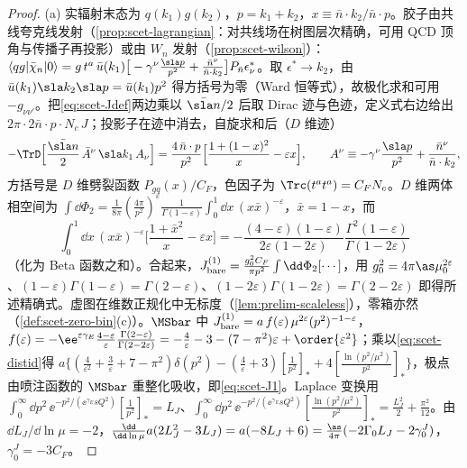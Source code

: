 \begin{proof}
(a) 实辐射末态为 $q(k_1)g(k_2)$，$p=k_1+k_2$，$x\equiv\bar n\cdot k_2/\bar n\cdot p$。胶子由共线夸克线发射（\cref{prop:scet-lagrangian}：对共线场在树图层次精确，可用 QCD 顶角与传播子再投影）或由 $W_n$ 发射（\cref{prop:scet-wilson}）：
$\langle qg|\bar\chi_n|0\rangle=g\,t^a\,\bar u(k_1)\big[-\gamma^\nu\frac{\sla p}{p^2}+\frac{\bar n^\nu}{\bar n\cdot k_2}\big]P_{\bar n}\epsilon^*_\nu$。取 $\epsilon^*\to k_2$，由 $\bar u(k_1)\sla k_2\sla p=\bar u(k_1)p^2$ 得方括号为零（Ward 恒等式），故极化求和可用 $-g_{\nu\nu'}$。把\cref{eq:scet-Jdef}两边乘以 $\bar{\sla n}/2$ 后取 Dirac 迹与色迹，定义式右边给出 $2\pi\cdot2\bar n\cdot p\cdot N_c\,J$；投影子在迹中消去，自旋求和后（$D$ 维迹）
\[
-\TrD\Big[\frac{\bar{\sla n}}{2}\,\bar A^\nu\,\sla k_1\,A_\nu\Big]=\frac{4\,\bar n\cdot p}{p^2}\Big[\frac{1+(1-x)^2}{x}-\varepsilon x\Big],\qquad A^\nu\equiv-\gamma^\nu\frac{\sla p}{p^2}+\frac{\bar n^\nu}{\bar n\cdot k_2},
\]
方括号是 $D$ 维劈裂函数 $P_{gq}(x)/C_F$，色因子为 $\Trc(t^at^a)=C_FN_c$。$D$ 维两体相空间为 $\int\dd\Phi_2=\frac{1}{8\pi}(\frac{4\pi}{p^2})^\varepsilon\frac{1}{\Gamma(1-\varepsilon)}\int_0^1\dd x\,(x\bar x)^{-\varepsilon}$，$\bar x=1-x$，而
\[
\int_0^1\dd x\,(x\bar x)^{-\varepsilon}\Big[\frac{1+\bar x^2}{x}-\varepsilon x\Big]=-\frac{(4-\varepsilon)(1-\varepsilon)}{2\varepsilon(1-2\varepsilon)}\frac{\Gamma^2(1-\varepsilon)}{\Gamma(1-2\varepsilon)}
\]
（化为 Beta 函数之和）。合起来，$J^{(1)}_{\rm bare}=\frac{g_0^2C_F}{\pi p^2}\int\dd\Phi_2[\cdots]$，用 $g_0^2=4\pi\as\mu_0^{2\varepsilon}$、$(1-\varepsilon)\Gamma(1-\varepsilon)=\Gamma(2-\varepsilon)$、$(1-2\varepsilon)\Gamma(1-2\varepsilon)=\Gamma(2-2\varepsilon)$ 即得所述精确式。虚图在维数正规化中无标度（\cref{lem:prelim-scaleless}），零箱亦然（\cref{def:scet-zero-bin}(c)）。$\MSbar$ 中 $J^{(1)}_{\rm bare}=a\,f(\varepsilon)\,\mu^{2\varepsilon}(p^2)^{-1-\varepsilon}$，$f(\varepsilon)=-\ee^{\varepsilon\gamma_E}\frac{4-\varepsilon}{\varepsilon}\frac{\Gamma(2-\varepsilon)}{\Gamma(2-2\varepsilon)}=-\frac4\varepsilon-3-(7-\pi^2)\varepsilon+\order{\varepsilon^2}$；乘以\cref{eq:scet-distid}得
$a\{(\frac4{\varepsilon^2}+\frac3\varepsilon+7-\pi^2)\delta(p^2)-(\frac4\varepsilon+3)[\frac1{p^2}]_*+4[\frac{\ln(p^2/\mu^2)}{p^2}]_*\}$，极点由喷注函数的 $\MSbar$ 重整化吸收，即\cref{eq:scet-J1}。Laplace 变换用 $\int_0^\infty\dd p^2\,\ee^{-p^2/(\ee^{\gamma_E}sQ^2)}[\frac1{p^2}]_*=L_J$、$\int_0^\infty\dd p^2\,\ee^{-p^2/(\ee^{\gamma_E}sQ^2)}[\frac{\ln(p^2/\mu^2)}{p^2}]_*=\frac{L_J^2}{2}+\frac{\pi^2}{12}$。由 $\dd L_J/\dd\ln\mu=-2$，$\frac{\dd}{\dd\ln\mu}a(2L_J^2-3L_J)=a(-8L_J+6)=\frac{\as}{4\pi}(-2\Gamma_0L_J-2\gamma^J_0)$，$\gamma^J_0=-3C_F$。%

\end{proof}
